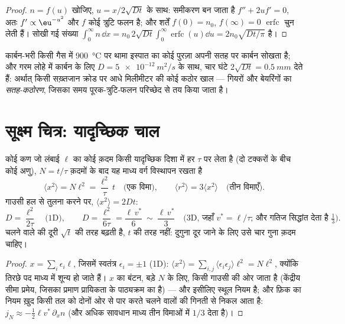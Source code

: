 \begin{proof}
$n = f(u)$ खोजिए, $u = x/2\sqrt{Dt}$ के साथ: समीकरण बन जाता है
$f'' + 2uf' = 0$, अतः $f' \propto \eu^{-u^2}$ और $f$ कोई त्रुटि
फलन है; और शर्तें $f(0) = n_0$, $f(\infty) = 0$
$\operatorname{erfc}$ चुन लेती हैं। सोखी गई संख्या $\int_0^\infty n\,\dd x =
n_0\,2\sqrt{Dt}\int_0^\infty\operatorname{erfc}(u)\dd u = 2n_0\sqrt{Dt/\pi}$ है।
\end{proof}

\begin{example}[इस्पात को कठोर करना]\label{ex:b2:particle-diffusion:carburising}
कार्बन-भरी किसी गैस में \qty{900}{\celsius} पर थामा इस्पात का कोई पुरज़ा
अपनी सतह पर कार्बन सोखता है; और गरम लोहे में कार्बन के लिए $D = \qty{5e-12}{m^2/s}$
के साथ, चार घंटे $2\sqrt{Dt} = \qty{0.5}{mm}$ देते हैं: अर्थात् किसी सख़्तजान क्रोड पर आधे
मिलीमीटर की कोई कठोर खाल --- गियरों और बेयरिंगों का \emph{सतह-कठोरण},
जिसका समय पूरक-त्रुटि-फलन परिच्छेद से तय किया जाता है।
\end{example}

\section{सूक्ष्म चित्र: यादृच्छिक चाल}\label{sec:b2:particle-diffusion:microscopic}

\begin{proposition}[यादृच्छिक चाल और विसरण गुणांक]\label{prop:b2:particle-diffusion:walk}
कोई कण जो लंबाई $\ell$ का कोई क़दम किसी यादृच्छिक दिशा में हर $\tau$ पर
लेता है (दो टक्करों के बीच कोई अणु), $N =
t/\tau$ क़दमों के बाद यह माध्य वर्ग विस्थापन रखता है
\[
\langle x^2\rangle = N\ell^2 = \frac{\ell^2}{\tau}\,t
\quad\text{(एक विमा)}, \qquad
\langle r^2\rangle = 3\langle x^2\rangle \quad\text{(तीन विमाएँ)}.
\]
गाउसी हल से तुलना करने पर, $\langle x^2\rangle = 2Dt$:
\[
D = \frac{\ell^2}{2\tau} \quad\text{(1D)}, \qquad
D = \frac{\ell^2}{6\tau} = \frac{\ell\,v^*}{6}\ \sim\ \frac{\ell\,v^*}{3}
\quad\text{(3D, जहाँ } v^* = \ell/\tau\text{; और गतिज सिद्धांत देता है } \tfrac13) .
\]
चलने वाले की दूरी $\sqrt t$ की तरह बढ़ती है, $t$ की तरह नहीं: दुगुना दूर जाने के लिए
उसे चार गुना क़दम चाहिए।
\end{proposition}

\begin{proof}
$x = \sum_i \epsilon_i\ell$, जिसमें स्वतंत्र $\epsilon_i = \pm1$ (1D):
$\langle x^2\rangle = \sum_{i,j}\langle\epsilon_i\epsilon_j\rangle\ell^2 =
N\ell^2$, क्योंकि तिरछे पद माध्य में शून्य हो जाते हैं। $x$ का बंटन, बड़े $N$ के लिए,
किसी गाउसी की ओर जाता है (केंद्रीय सीमा प्रमेय, जिसका
प्रमाण प्रायिकता के पाठ्यक्रम का है) --- और इसीलिए
स्थूल नियम  है; और फ़िक का नियम ख़ुद
किसी तल को दोनों ओर से पार करते चलने वालों की गिनती से निकल आता है: $j_N \approx
-\tfrac12\ell v^*\,\partial_x n$ (और अधिक सावधान माध्य तीन विमाओं में $1/3$ देता है)।
\end{proof}

